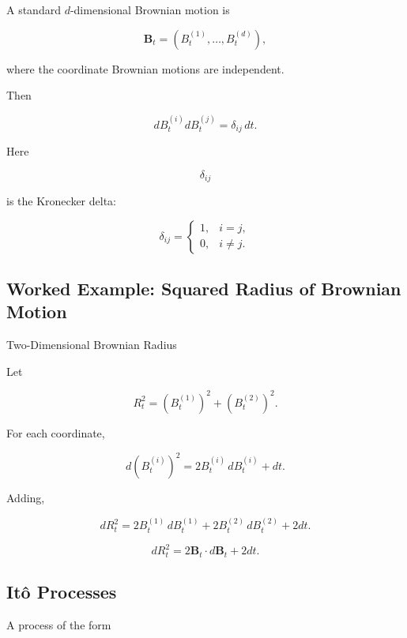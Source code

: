 A standard \(d\)-dimensional Brownian motion is

\[
\boxed{
\mathbf{B}_t
=
(B_t^{(1)},\ldots,B_t^{(d)}),
}
\]

where the coordinate Brownian motions are independent.

Then

\[
\boxed{
dB_t^{(i)}
dB_t^{(j)}
=
\delta_{ij}\,dt.
}
\]

Here

\[
\delta_{ij}
\]

is the Kronecker delta:

\[
\delta_{ij}
=
\begin{cases}
1,&i=j,\\
0,&i\neq j.
\end{cases}
\]

\subsection{Worked Example: Squared Radius of Brownian Motion}
\label{subsec:worked-brownian-radius-square}

\begin{workedexamplebox}{Two-Dimensional Brownian Radius}

Let

\[
R_t^2
=
(B_t^{(1)})^2
+
(B_t^{(2)})^2.
\]

For each coordinate,

\[
d(B_t^{(i)})^2
=
2B_t^{(i)}\,dB_t^{(i)}
+
dt.
\]

Adding,

\[
dR_t^2
=
2B_t^{(1)}\,dB_t^{(1)}
+
2B_t^{(2)}\,dB_t^{(2)}
+
2dt.
\]

\begin{answerbox}
\[
\boxed{
dR_t^2
=
2\mathbf{B}_t\cdot d\mathbf{B}_t
+
2dt.
}
\]
\end{answerbox}

\end{workedexamplebox}

\subsection{It\^o Processes}
\label{subsec:ito-processes}

A process of the form

